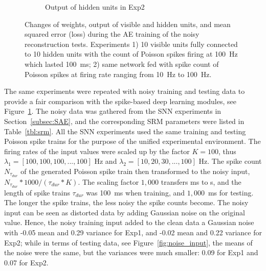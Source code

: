 \begin{figure}
\begin{subfigure}[t]{0.45\textwidth}
		\caption{Output of hidden units in Exp2}
	\end{subfigure}
	\caption{Changes of weights, output of visible and hidden units, and mean squared error (loss) during the AE training of the noisy reconstruction tests. 
		Experiments 1) 10 visible units fully connected to 10 hidden units with the count of Poisson spikes firing at 100~Hz which lasted 100~ms; 2) same network fed with spike count of Poisson spikes at firing rate ranging from 10~Hz to 100~Hz.}
	\label{fig:ae_noise}
\end{figure}

The same experiments were repeated with noisy training and testing data to provide a fair comparison with the spike-based deep learning modules, see Figure~\ref{fig:ae_noise}.
The noisy data was gathered from the SNN experiments in Section~\ref{subsec:SAE}, and the corresponding SRM parameters were listed in Table~\ref{tbl:srm}.
All the SNN experiments used the same training and testing Poisson spike trains for the purpose of the unified experimental environment.
The firing rates of the input values were scaled up by the factor $K = 100$, thus $\lambda_1 = [100, 100, 100, ..., 100]$ Hz and $\lambda_2 = [10, 20, 30, ..., 100]$ Hz.
The spike count $N_{\tau_{dur}}$ of the generated Poisson spike train then transformed to the noisy input, $N_{\tau_{dur}}*1000/(\tau_{dur} * K)$.
The scaling factor $1,000$ transfers ms to s, and the length of spike trains $\tau_{dur}$ was 100~ms when training, and $1,000$~ms for testing.
The longer the spike trains, the less noisy the spike counts become.
The noisy input can be seen as distorted data by adding Gaussian noise on the original value.
Hence, the noisy training input added to the clean data a Gaussian noise with -0.05 mean and 0.29 variance for Exp1, and -0.02 mean and 0.22 variance for Exp2;
while in terms of testing data, see Figure~\ref{fig:noise_input}, the means of the noise were the same, but the variances were much smaller: 0.09 for Exp1 and 0.07 for Exp2.
